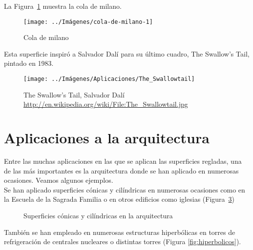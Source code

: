 \documentclass[10pt,a4paper]{article}
\begin{document}
La Figura~\ref{fig:cola-de-milano-1} muestra la cola de milano.\\

\begin{figure}
	\centering
	\texttt{[image: ../Imágenes/cola-de-milano-1]}
	\caption{Cola de milano}
	\label{fig:cola-de-milano-1}
\end{figure}

Esta superficie inspiró a Salvador Dalí para su último cuadro, The Swallow's Tail, pintado en 1983.

\begin{figure}[htbp]
	\centering
	\texttt{[image: ../Imágenes/Aplicaciones/The\_Swallowtail]}
 	\caption[The Swallow's Tail]{The Swallow's Tail, Salvador Dalí \url{http://en.wikipedia.org/wiki/File:The\_Swallowtail.jpg}}
	\label{fig:dali}
\end{figure}

\section{Aplicaciones a la arquitectura}

Entre las muchas aplicaciones en las que se aplican las superficies regladas, una de las más importantes es la arquitectura donde se han aplicado en numerosas ocasiones. Veamos algunos ejemplos.\\

Se han aplicado superficies cónicas y cilíndricas en numerosas ocasiones como en la Escuela de la Sagrada Familia o en otros edificios como iglesias (Figura~\ref{fig:conos-y-cilindros})

\begin{figure}[htbp]
\centering
{}
\caption{Superficies cónicas y cilíndricas en la arquitectura} \label{fig:conos-y-cilindros}
\end{figure}

También se han empleado en numerosas estructuras hiperbólicas en torres de refrigeración de centrales nucleares o distintas torres (Figura \ref{fig:hiperbolicos}).\\
\end{document}
